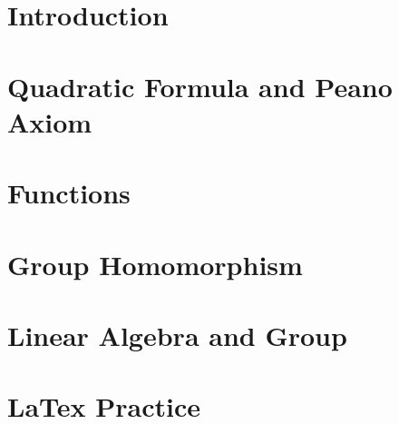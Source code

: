 \documentclass[12pt,openany]{book}
\begin{document}
	
	
	\tableofcontents
	\newpage
	\chapter{Introduction}
	
	
	\newpage
	\chapter{Quadratic Formula and Peano Axiom}
	
	
	\newpage
	\chapter{Functions}
	
	
	\newpage
	\chapter{Group Homomorphism}
	
	
	\newpage
	\chapter{Linear Algebra and Group}
	
	
	\newpage
	\chapter*{LaTex Practice}
	
	
	\newpage
	\appendix
	
	
\end{document}
